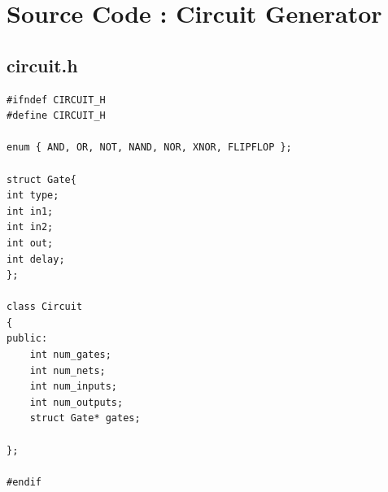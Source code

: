\documentclass[a4paper,onesided,12pt]{report}
\begin{document}
\appendix




\chapter{Source Code : Circuit Generator}
\section{circuit.h}
\tiny \begin{verbatim} 
#ifndef CIRCUIT_H
#define CIRCUIT_H

enum { AND, OR, NOT, NAND, NOR, XNOR, FLIPFLOP };

struct Gate{
int type;
int in1;
int in2;
int out;
int delay;
};

class Circuit
{
public:
	int num_gates;
	int num_nets;
	int num_inputs;
	int num_outputs;
	struct Gate* gates;

};

#endif
\end{verbatim}
\end{document}
